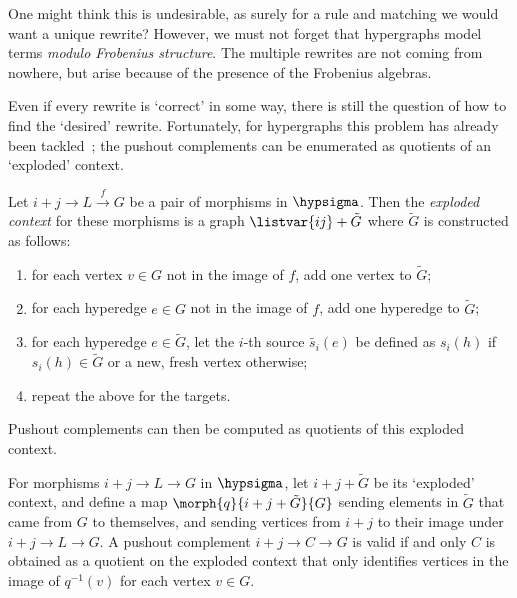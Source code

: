 One might think this is undesirable, as surely for a rule and matching we would
want a unique rewrite?
However, we must not forget that hypergraphs model terms
\emph{modulo Frobenius structure}.
The multiple rewrites are not coming from nowhere, but arise because of the
presence of the Frobenius algebras.

\begin{example}
\end{example}

Even if every rewrite is `correct' in some way, there is still the question of
how to find the `desired' rewrite.
Fortunately, for hypergraphs this problem has already been
tackled~\cite{heumuller2011construction}; the pushout complements can be
enumerated as quotients of an `exploded' context.

\begin{definition}
    Let \(i+j \to L \xrightarrow{f} G\) be a pair of morphisms in
    \(\hypsigma\).
    Then the \emph{exploded context} for these morphisms is a graph
    \(\listvar{ij} + \tilde{G}\) where \(\tilde{G}\) is constructed as follows:
    \begin{enumerate}
        \item for each vertex \(v \in G\) not in the image of \(f\), add one
              vertex to \(\tilde{G}\);
        \item for each hyperedge \(e \in G\) not in the image of \(f\), add one
              hyperedge to \(\tilde{G}\);
        \item for each hyperedge \(e \in \tilde{G}\), let the \(i\)-th source
              \(\tilde{s_i}(e)\) be defined as \(s_i(h)\) if
              \(s_i(h) \in \tilde{G}\) or a new, fresh vertex otherwise;
        \item repeat the above for the targets.
    \end{enumerate}
\end{definition}

Pushout complements can then be computed as quotients of this exploded
context.

\begin{proposition}
    For morphisms \(i+j \to L \to G\) in \(\hypsigma\), let
    \(i + j + \tilde{G}\) be its `exploded' context, and define a map
    \(\morph{q}{i + j + \tilde{G}}{G}\) sending elements in \(\tilde{G}\)
    that came from \(G\) to themselves, and sending vertices from
    \(i + j\) to their image under \(i + j \to L \to G\).
    A pushout complement \(i + j \to C \to G\) is valid if and only
    \(C\) is obtained as a quotient on the exploded context
    that only identifies vertices in the image of \(q^{-1}(v)\) for each vertex
    \(v \in G\).
\end{proposition}

